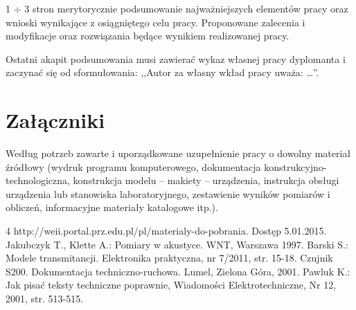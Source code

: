 \documentclass[12pt,twoside]{article}
\begin{document}
1 $\div$ 3 stron merytorycznie podsumowanie najważniejszych elementów pracy oraz wnioski wynikające z osiągniętego celu pracy. Proponowane zalecenia i modyfikacje oraz rozwiązania będące wynikiem realizowanej pracy.

Ostatni akapit podsumowania musi zawierać wykaz własnej pracy dyplomanta i zaczynać się od sformułowania: ,,Autor za własny wkład pracy uważa: \ldots''.


\section*{Załączniki}

Według potrzeb zawarte i uporządkowane uzupełnienie pracy o dowolny materiał źródłowy (wydruk programu komputerowego, dokumentacja kons\-truk\-cyj\-no-\-tech\-no\-lo\-gicz\-na, konstrukcja modelu -- makiety -- urządzenia, instrukcja obsługi urządzenia lub stanowiska laboratoryjnego, zestawienie wyników pomiarów i obliczeń, informacyjne materiały katalogowe itp.).


\clearpage


\begin{thebibliography}{4}
 http://weii.portal.prz.edu.pl/pl/materialy-do-pobrania. Dostęp 5.01.2015.
 Jakubczyk T., Klette A.: Pomiary w akustyce. WNT, Warszawa 1997.
 Barski S.: Modele transmitancji. Elektronika praktyczna, nr 7/2011, str. 15-18.
 Czujnik S200. Dokumentacja techniczno-ruchowa. Lumel, Zielona Góra, 2001.
 Pawluk K.: Jak pisać teksty techniczne poprawnie, Wiadomości Elektrotechniczne, Nr 12, 2001, str. 513-515.
\end{thebibliography}

\clearpage

\makesummary
\end{document}
